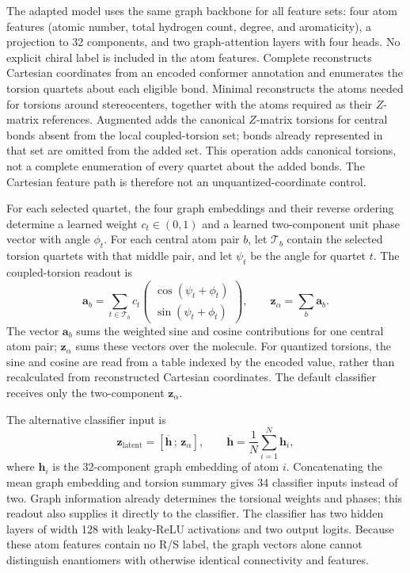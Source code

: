 \documentclass[%
 preprint,
superscriptaddress,
 amsmath,amssymb,
 aip,
 jcp,
]{revtex4-2}
\begin{document}
The adapted model uses the same graph backbone for all feature sets: four atom features (atomic number, total hydrogen count, degree, and aromaticity), a projection to 32 components, and two graph-attention layers with four heads.
No explicit chiral label is included in the atom features.
Complete reconstructs Cartesian coordinates from an encoded conformer annotation and enumerates the torsion quartets about each eligible bond.
Minimal reconstructs the atoms needed for torsions around stereocenters, together with the atoms required as their $Z$-matrix references.
Augmented adds the canonical $Z$-matrix torsions for central bonds absent from the local coupled-torsion set; bonds already represented in that set are omitted from the added set.
This operation adds canonical torsions, not a complete enumeration of every quartet about the added bonds.
The Cartesian feature path is therefore not an unquantized-coordinate control.

For each selected quartet, the four graph embeddings and their reverse ordering determine a learned weight $c_t\in(0,1)$ and a learned two-component unit phase vector with angle $\phi_t$.
For each central atom pair $b$, let $\mathcal T_b$ contain the selected torsion quartets with that middle pair, and let $\psi_t$ be the angle for quartet $t$.
The coupled-torsion readout is
\begin{equation}
 \mathbf a_b=\sum_{t\in\mathcal T_b}c_t
 \begin{pmatrix}\cos(\psi_t+\phi_t)\\\sin(\psi_t+\phi_t)\end{pmatrix},
 \qquad
 \mathbf z_\alpha=\sum_b\mathbf a_b.
 \label{eq:ml_torsion_readout}
\end{equation}
The vector $\mathbf a_b$ sums the weighted sine and cosine contributions for one central atom pair; $\mathbf z_\alpha$ sums these vectors over the molecule.
For quantized torsions, the sine and cosine are read from a table indexed by the encoded value, rather than recalculated from reconstructed Cartesian coordinates.
The default classifier receives only the two-component $\mathbf z_\alpha$.

The alternative classifier input is
\begin{equation}
 \mathbf z_{\mathrm{latent}}=
 [\overline{\mathbf h}\,;\,\mathbf z_\alpha],\qquad
 \overline{\mathbf h}=\frac{1}{N}\sum_{i=1}^{N}\mathbf h_i,
 \label{eq:ml_latent_readout}
\end{equation}
where $\mathbf h_i$ is the 32-component graph embedding of atom $i$.
Concatenating the mean graph embedding and torsion summary gives 34 classifier inputs instead of two.
Graph information already determines the torsional weights and phases; this readout also supplies it directly to the classifier.
The classifier has two hidden layers of width 128 with leaky-ReLU activations and two output logits.
Because these atom features contain no R/S label, the graph vectors alone cannot distinguish enantiomers with otherwise identical connectivity and features.
\end{document}
